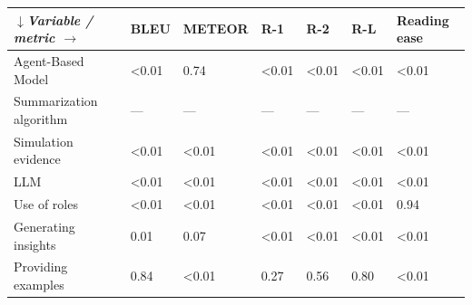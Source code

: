 \begin{tabular}{|l|l|l|l|l|l|l|}
\hline
\textit{$\downarrow$Variable / metric $\rightarrow$} & BLEU & METEOR & R-1 & R-2 & R-L & Reading ease \\
 \hline
 Agent-Based Model & \textless{}0.01 & 0.74 & \textless{}0.01 & \textless{}0.01 & \textless{}0.01 & \textless{}0.01 \\
 \hline
 Summarization algorithm & — & — & — & — & — & — \\
 \hline
 Simulation evidence & \textless{}0.01 & \textless{}0.01 & \textless{}0.01 & \textless{}0.01 & \textless{}0.01 & \textless{}0.01 \\
 \hline
 LLM & \textless{}0.01 & \textless{}0.01 & \textless{}0.01 & \textless{}0.01 & \textless{}0.01 & \textless{}0.01 \\
 \hline
 Use of roles & \textless{}0.01 & \textless{}0.01 & \textless{}0.01 & \textless{}0.01 & \textless{}0.01 & 0.94 \\
 \hline
 Generating insights & 0.01 & 0.07 & \textless{}0.01 & \textless{}0.01 & \textless{}0.01 & \textless{}0.01 \\
 \hline
 Providing examples & 0.84 & \textless{}0.01 & 0.27 & 0.56 & 0.80 & \textless{}0.01 \\
\hline
\end{tabular}
